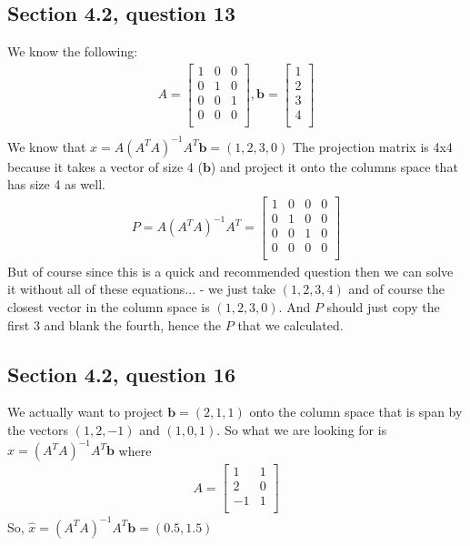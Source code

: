 \documentclass[a4paper,11pt]{article}
\newcommand{\mybf}[1]{\boldsymbol{#1}}
\begin{document}
\subsection*{Section 4.2, question 13}
We know the following:
\begin{align*}
A=
\begin{bmatrix}
1 & 0 & 0 \\
0 & 1 & 0 \\
0 & 0 & 1 \\
0 & 0 & 0 \\
\end{bmatrix},
\mybf{b}=
\begin{bmatrix}
1  \\
2  \\
3  \\
4  \\
\end{bmatrix}\\
\end{align*}
We know that $\hat{x} = A(A^TA)^{-1}A^T\mybf{b}=(1,2,3,0)$
The projection matrix is 4x4 because it takes a vector of size 4 ($\mybf{b}$) and project it onto the columns space that has size 4 as well.
\begin{align*}
P=A(A^TA)^{-1}A^T = 
\begin{bmatrix}
1 & 0 & 0 & 0 \\
0 & 1 & 0 & 0\\
0 & 0 & 1 & 0\\
0 & 0 & 0 & 0\\
\end{bmatrix}
\end{align*}
But of course since this is a quick and recommended question then we can solve it without all of these equations... - we just take $(1,2,3,4)$ and of course the closest vector in the column space is $(1,2,3,0)$. And $P$ should just copy the first 3 and blank the fourth, hence the $P$ that we calculated.
\subsection*{Section 4.2, question 16}
We actually want to project $\mybf{b} = (2,1,1)$ onto the column space that is span by the vectors $(1,2,-1)$ and $(1,0,1)$. So what we are looking for is $\hat{x}=(A^TA)^{-1}A^T\mybf{b}$ where 
\begin{align*}
A = 
\begin{bmatrix}
1 & 1  \\
2 & 0  \\
-1 & 1 \\
\end{bmatrix}
\end{align*}
So,
$\hat{x}=(A^TA)^{-1}A^T\mybf{b} = (0.5, 1.5)$
\end{document}
